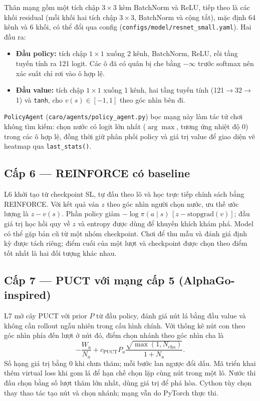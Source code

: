 Thân mạng gồm một tích chập $3\times3$ kèm BatchNorm và ReLU, tiếp theo là các khối residual (mỗi khối hai tích chập $3\times 3$, BatchNorm và cộng tắt), mặc định 64 kênh và 6 khối, có thể đổi qua config (\texttt{configs/model/resnet\_small.yaml}). Hai đầu ra:
\begin{itemize}
  \item \textbf{Đầu policy:} tích chập $1\times1$ xuống 2 kênh, BatchNorm, ReLU, rồi tầng tuyến tính ra 121 logit. Các ô đã có quân bị che bằng $-\infty$ trước softmax nên xác suất chỉ rơi vào ô hợp lệ.
  \item \textbf{Đầu value:} tích chập $1\times1$ xuống 1 kênh, hai tầng tuyến tính (121$\to$32$\to$1) và \texttt{tanh}, cho $v(s)\in[-1,1]$ theo góc nhìn bên đi.
\end{itemize}
\texttt{PolicyAgent} (\texttt{caro/agents/policy\_agent.py}) bọc mạng này làm tác tử chơi không tìm kiếm: chọn nước có logit lớn nhất ($\arg\max$, tương ứng nhiệt độ 0) trong các ô hợp lệ, đồng thời giữ phân phối policy và giá trị value để giao diện vẽ heatmap qua \texttt{last\_stats()}.
\subsection{Cấp 6 --- REINFORCE có baseline}
L6 khởi tạo từ checkpoint SL, tự đấu theo lô và học trực tiếp chính sách bằng REINFORCE. Với kết quả ván $z$ theo góc nhìn người chọn nước, ưu thế ước lượng là $z-v(s)$. Phần policy giảm $-\log\pi(a\mid s)\,[z-\mathrm{stopgrad}(v)]$; đầu giá trị học hồi quy về $z$ và entropy được dùng để khuyến khích khám phá. Model có thể gặp bản cũ từ một nhóm checkpoint. Chơi để thu mẫu và đánh giá định kỳ được tách riêng; điểm cuối của một lượt và checkpoint được chọn theo điểm tốt nhất là hai đối tượng khác nhau.
\subsection{Cấp 7 --- PUCT với mạng cấp 5 (AlphaGo-inspired)}
L7 mở cây PUCT với prior $P$ từ đầu policy, đánh giá nút lá bằng đầu value và không cần rollout ngẫu nhiên trong cấu hình chính. Với thống kê nút con theo góc nhìn phía đến lượt ở nút đó, điểm chọn nhánh theo góc nhìn cha là
\[
 -\frac{W_a}{N_a}+c_{\mathrm{PUCT}}P_a\frac{\sqrt{\max(1,N_{\mathrm{cha}})}}{1+N_a}.
\]
Số hạng giá trị bằng 0 khi chưa thăm; mỗi bước lan ngược đổi dấu. Mã triển khai thêm virtual loss khi gom lá để hạn chế chọn lặp cùng nút trong một lô. Nước thi đấu chọn bằng số lượt thăm lớn nhất, dùng giá trị để phá hòa. Cython tùy chọn thay thao tác tạo nút và chọn nhánh; mạng vẫn do PyTorch thực thi.
